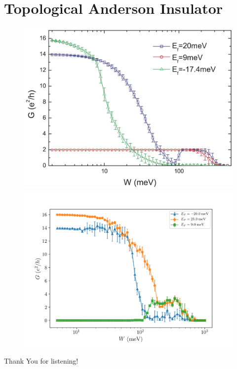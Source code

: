\documentclass[12pt]{article}
\numberwithin{equation}{section}
\begin{document}
\newpage
\section*{Topological Anderson Insulator}
\begin{figure}[h!]
  \centering
  \begin{minipage}{0.47\textwidth}
    \centering
    \includegraphics[width=1.0\textwidth]{./media/tai_results_from_article.png} %
\end{minipage}\hfill
  \begin{minipage}{0.53\textwidth}
      \centering
      \includegraphics[width=1.0\textwidth]{./media/tai_results_params1_nsamples=4.png} %
  \end{minipage}
\end{figure}

\newpage
\nocite{*}



\newpage
{}
\vspace*{\fill}
\begin{center}
    \LARGE{Thank You for listening!}
\end{center}
\vspace*{\fill}
\end{document}
